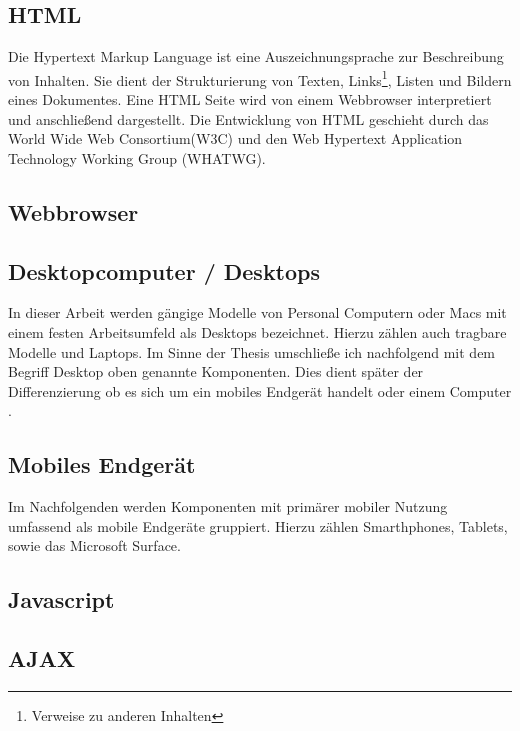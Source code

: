 		\subsection{HTML}
		Die Hypertext Markup Language ist eine Auszeichnungsprache zur Beschreibung von Inhalten. Sie dient der Strukturierung 		von Texten, Links\footnote{Verweise zu anderen Inhalten}, Listen und Bildern eines Dokumentes. Eine HTML Seite wird von 		einem Webbrowser interpretiert und anschließend dargestellt. Die Entwicklung von HTML geschieht durch das World Wide 		Web Consortium(W3C) und den Web Hypertext Application Technology Working Group (WHATWG). 

		\subsection{Webbrowser}
		\subsection{Desktopcomputer / Desktops}
		In dieser Arbeit werden gängige Modelle von Personal Computern oder Macs mit einem festen Arbeitsumfeld als Desktops 		bezeichnet. Hierzu zählen auch tragbare Modelle und Laptops. Im Sinne der Thesis umschließe ich nachfolgend mit dem 		Begriff Desktop oben genannte Komponenten. Dies dient später der Differenzierung ob es sich um ein mobiles Endgerät 			handelt oder einem Computer .

		\subsection{Mobiles Endgerät}
		Im Nachfolgenden werden Komponenten mit primärer mobiler Nutzung umfassend als mobile Endgeräte gruppiert. Hierzu 		zählen Smarthphones, Tablets, sowie das Microsoft Surface.

		\subsection{Javascript}
		\subsection{AJAX}
		
